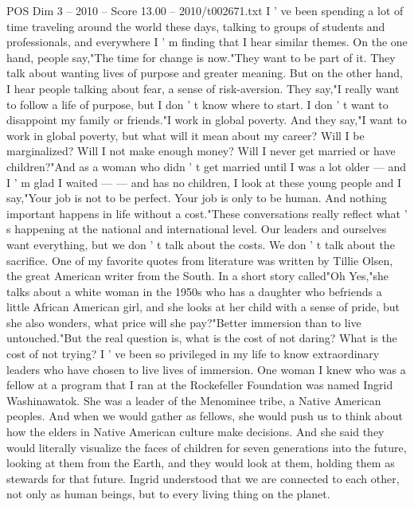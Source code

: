 \begin{textsample}{POS Dim 3 – 2010 – Score 13.00 – 2010/t002671.txt}  \label{ex:f3_pos_056}
I ' ve been spending a lot of time traveling around the world these days, talking to groups of students and professionals, and everywhere I ' m finding that I hear similar themes.
On the one hand, people say,"The time for change is now."They want to be part of it.
They talk about wanting lives of purpose and greater meaning.
But on the other hand, I hear people talking about fear, a sense of risk-aversion.
They say,"I really want to follow a life of purpose, but I don ' t know where to start.
I don ' t want to disappoint my family or friends."I work in global poverty.
And they say,"I want to work in global poverty, but what will it mean about my career?
Will I be marginalized?
Will I not make enough money?
Will I never get married or have children?"And as a woman who didn ' t get married until I was a lot older — and I ' m glad I waited — — and has no children, I look at these young people and I say,"Your job is not to be perfect.
Your job is only to be human.
And nothing important happens in life without a cost."These conversations really reflect what ' s happening at the national and international level.
Our leaders and ourselves want everything, but we don ' t talk about the costs.
We don ' t talk about the sacrifice.
One of my favorite quotes from literature was written by Tillie Olsen, the great American writer from the South.
In a short story called"Oh Yes,"she talks about a white woman in the 1950s who has a daughter who befriends a little African American girl, and she looks at her child with a sense of pride, but she also wonders, what price will she pay?"Better immersion than to live untouched."But the real question is, what is the cost of not daring?
What is the cost of not trying?
I ' ve been so privileged in my life to know extraordinary leaders who have chosen to live lives of immersion.
One woman I knew who was a fellow at a program that I ran at the Rockefeller Foundation was named Ingrid Washinawatok.
She was a leader of the Menominee tribe, a Native American peoples.
And when we would gather as fellows, she would push us to think about how the elders in Native American culture make decisions.
And she said they would literally visualize the faces of children for seven generations into the future, looking at them from the Earth, and they would look at them, holding them as stewards for that future.
Ingrid understood that we are connected to each other, not only as human beings, but to every living thing on the planet.

\end{textsample}
